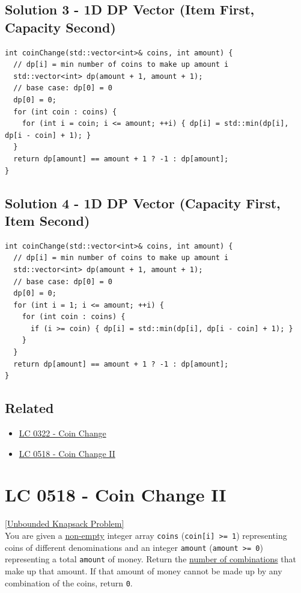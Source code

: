 \subsection*{Solution 3 - 1D DP Vector (Item First, Capacity Second)}
\begin{lstlisting}
int coinChange(std::vector<int>& coins, int amount) {
  // dp[i] = min number of coins to make up amount i
  std::vector<int> dp(amount + 1, amount + 1);
  // base case: dp[0] = 0
  dp[0] = 0;
  for (int coin : coins) {
    for (int i = coin; i <= amount; ++i) { dp[i] = std::min(dp[i], dp[i - coin] + 1); }
  }
  return dp[amount] == amount + 1 ? -1 : dp[amount];
}
\end{lstlisting}

\subsection*{Solution 4 - 1D DP Vector (Capacity First, Item Second)}
\begin{lstlisting}
int coinChange(std::vector<int>& coins, int amount) {
  // dp[i] = min number of coins to make up amount i
  std::vector<int> dp(amount + 1, amount + 1);
  // base case: dp[0] = 0
  dp[0] = 0;
  for (int i = 1; i <= amount; ++i) {
    for (int coin : coins) {
      if (i >= coin) { dp[i] = std::min(dp[i], dp[i - coin] + 1); }
    }
  }
  return dp[amount] == amount + 1 ? -1 : dp[amount];
}
\end{lstlisting}

\subsection*{Related}
\begin{itemize}
\item \hyperref[lc0322]{LC 0322 - Coin Change}
\item \hyperref[lc0518]{LC 0518 - Coin Change II}
\end{itemize}

\section{LC 0518 - Coin Change II}\label{lc0518}
{\hyperref[subsubsec:unbounded_knapsack_oj_problems]{[Unbounded Knapsack Problem]}} \\

You are given a \ul{non-empty} integer array {\colorbox{CodeBackground}{\lstinline|coins|}} ({\colorbox{CodeBackground}{\lstinline|coin[i] >= 1|}}) representing coins of different denominations and an integer {\colorbox{CodeBackground}{\lstinline|amount|}} ({\colorbox{CodeBackground}{\lstinline|amount >= 0|}}) representing a total {\colorbox{CodeBackground}{\lstinline|amount|}} of money. Return the \ul{number of combinations} that make up that amount. If that amount of money cannot be made up by any combination of the coins, return {\colorbox{CodeBackground}{\lstinline|0|}}.\\

